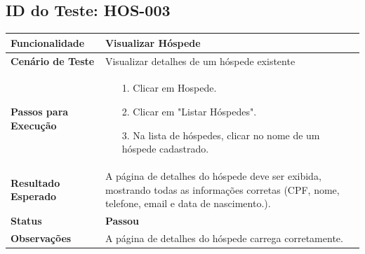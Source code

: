 \documentclass[
	12pt,				%
	openany,			%
	oneside,			%
	a4paper,			%
	english,			%
	french,				%
	spanish,			%
	brazil				%
	]{abntex2}
\begin{document}
\begin{apendicesenv}
	\subsection*{ID do Teste: HOS-003}
	\begin{tabular}{@{} p{5cm} p{11cm} @{}}
		\toprule
		\textbf{Funcionalidade} & Visualizar Hóspede \\
		\midrule
		\textbf{Cenário de Teste} & Visualizar detalhes de um hóspede existente \\
		\midrule
		\textbf{Passos para Execução} &
		\begin{itemize} \itemsep0em 
			\item[1.] Clicar em Hospede.
			\item[2.] Clicar em "Listar Hóspedes".
			\item[3.] Na lista de hóspedes, clicar no nome de um hóspede cadastrado.
		\end{itemize} \\
		\midrule
		\textbf{Resultado Esperado} & A página de detalhes do hóspede deve ser exibida, mostrando todas as informações corretas (CPF, nome, telefone, email e data de nascimento.). \\
		\midrule
		\textbf{Status} & \textbf{Passou} \\
		\midrule
		\textbf{Observações} & A página de detalhes do hóspede carrega corretamente. \\
		\bottomrule
	\end{tabular}
	\vspace{1cm}
	

\end{apendicesenv}
\end{document}
